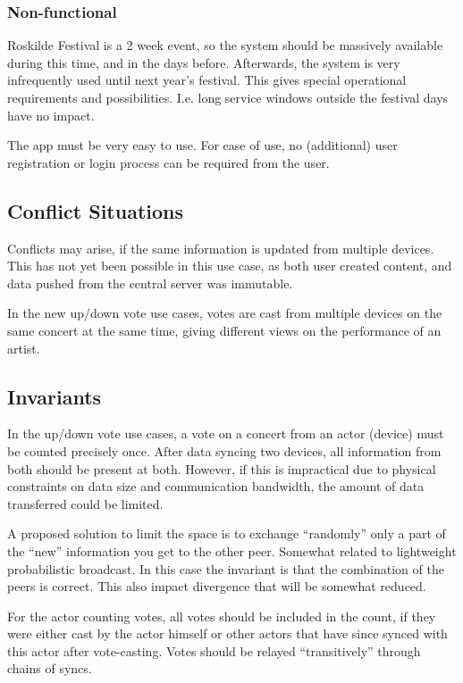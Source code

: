 \documentclass[11pt,a4paper]{report}
\begin{document}
\subsubsection{Non-functional}
Roskilde Festival is a 2 week event, so the system should be massively available during this time, and in the days before. Afterwards, the system is very infrequently used until next year's festival. This gives special operational requirements and possibilities. I.e. long service windows outside the festival days have no impact.

The app must be very easy to use. For ease of use, no (additional) user registration or login process can be required from the user. 

\subsection{Conflict Situations}
Conflicts may arise, if the same information is updated from multiple devices. This has not yet been possible in this use case, as both user created content, and data pushed from the central server was immutable.

In the new up/down vote use cases, votes are cast from multiple devices on the same concert at the same time, giving different views on the performance of an artist.

\subsection{Invariants}
In the up/down vote use cases, a vote on a concert from an actor (device) must be counted precisely once. 
After data syncing two devices, all information from both should be present at both. 
However, if this is impractical due to physical constraints on data size and communication bandwidth, the amount of data transferred  could be limited. 

A proposed solution to limit the space is to exchange ``randomly'' only a part of the ``new'' information you get to the other peer. Somewhat related to lightweight probabilistic broadcast. In this case the invariant is that the combination of  the peers is correct. This also impact divergence that will be somewhat reduced.

For the actor counting votes, all votes should be included in the count, if they were either cast by the actor himself or other actors that have since synced with this actor after vote-casting. Votes should be relayed ``transitively'' through chains of syncs.
\end{document}

